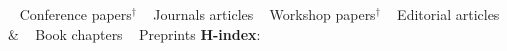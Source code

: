 


\setcounter{nC}{78}  %
\setcounter{nJ}{15}  %
\setcounter{nW}{33}  %
\setcounter{nBc}{5}  %
\setcounter{nE}{4}  %
\setcounter{nB}{2}  %
\setcounter{nP}{20}  %

\newcommand{\realcount}[1]{%
  \number\numexpr\value{#1}-1\relax%
}
\newcommand{\decvalue}[1]{%
  \addtocounter{#1}{-1}%
  \number\value{#1}%
}

\setcounter{tabc}{77}
\newcommand{\labelc}[1]{%
  \addtocounter{tabc}{-1}%
  \phantomsection       %
  \label{#1}%
}

\setcounter{tabw}{33}
\newcommand{\labelw}[1]{%
  \addtocounter{tabw}{-1}%
  \phantomsection       %
  \label{#1}%
}



\smallskip
\begin{keywords}
{			 \faAngleRight~ \nemph{\realcount{nC}} Conference papers$^{\dagger}$
\hspace{4pt} \faAngleRight~ \nemph{\realcount{nJ}} Journals articles
\hspace{4pt} \faAngleRight~ \nemph{\realcount{nW}} Workshop papers$^{\dagger}$
\hspace{4pt} \faAngleRight~ \nemph{\realcount{nE}} Editorial articles
		 \\& \faAngleRight~ \nemph{\realcount{nBc}} Book chapters
\hspace{4pt} \faAngleRight~ \nemph{\realcount{nP}} Preprints
}
{\citNo \hspace{8pt} 
 \textbf{H-index}: \hIndex \hspace{8pt} 
 }%
\end{keywords}

